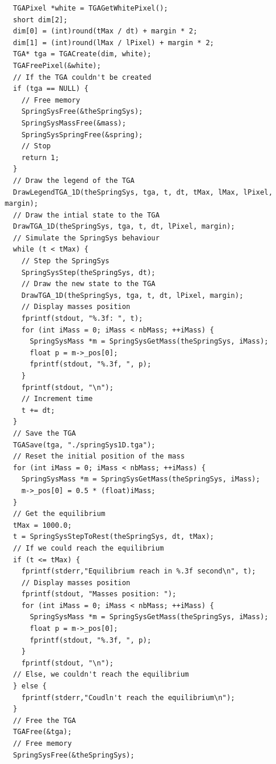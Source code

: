\documentclass[12pt, a4paper]{article}
\begin{document}
\begin{scriptsize}
\begin{ttfamily}
\begin{lstlisting}
  TGAPixel *white = TGAGetWhitePixel();
  short dim[2];
  dim[0] = (int)round(tMax / dt) + margin * 2;
  dim[1] = (int)round(lMax / lPixel) + margin * 2;
  TGA* tga = TGACreate(dim, white);
  TGAFreePixel(&white);
  // If the TGA couldn't be created
  if (tga == NULL) {
    // Free memory
    SpringSysFree(&theSpringSys);
    SpringSysMassFree(&mass);
    SpringSysSpringFree(&spring);
    // Stop
    return 1;
  }
  // Draw the legend of the TGA
  DrawLegendTGA_1D(theSpringSys, tga, t, dt, tMax, lMax, lPixel, margin);
  // Draw the intial state to the TGA
  DrawTGA_1D(theSpringSys, tga, t, dt, lPixel, margin);
  // Simulate the SpringSys behaviour
  while (t < tMax) {
    // Step the SpringSys
    SpringSysStep(theSpringSys, dt);
    // Draw the new state to the TGA
    DrawTGA_1D(theSpringSys, tga, t, dt, lPixel, margin);
    // Display masses position
    fprintf(stdout, "%.3f: ", t);
    for (int iMass = 0; iMass < nbMass; ++iMass) {
      SpringSysMass *m = SpringSysGetMass(theSpringSys, iMass);
      float p = m->_pos[0];
      fprintf(stdout, "%.3f, ", p);
    }
    fprintf(stdout, "\n");
    // Increment time
    t += dt;
  }
  // Save the TGA
  TGASave(tga, "./springSys1D.tga");
  // Reset the initial position of the mass
  for (int iMass = 0; iMass < nbMass; ++iMass) {
    SpringSysMass *m = SpringSysGetMass(theSpringSys, iMass);
    m->_pos[0] = 0.5 * (float)iMass;
  }
  // Get the equilibrium
  tMax = 1000.0;
  t = SpringSysStepToRest(theSpringSys, dt, tMax);
  // If we could reach the equilibrium
  if (t <= tMax) {
    fprintf(stderr,"Equilibrium reach in %.3f second\n", t);
    // Display masses position
    fprintf(stdout, "Masses position: ");
    for (int iMass = 0; iMass < nbMass; ++iMass) {
      SpringSysMass *m = SpringSysGetMass(theSpringSys, iMass);
      float p = m->_pos[0];
      fprintf(stdout, "%.3f, ", p);
    }
    fprintf(stdout, "\n");
  // Else, we couldn't reach the equilibrium
  } else {
    fprintf(stderr,"Coudln't reach the equilibrium\n");
  }
  // Free the TGA
  TGAFree(&tga);
  // Free memory
  SpringSysFree(&theSpringSys);



\end{lstlisting}
\end{ttfamily}
\end{scriptsize}
\end{document}
